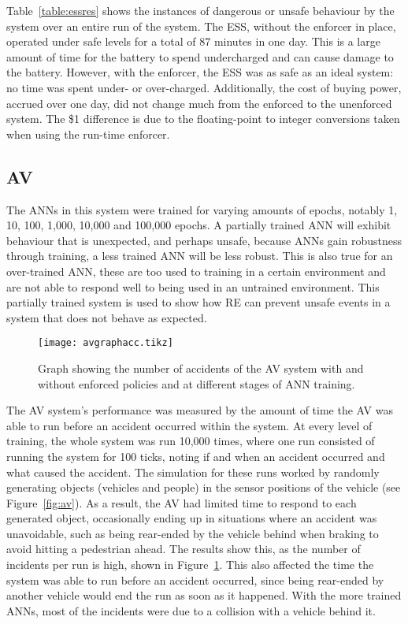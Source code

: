 Table~\ref{table:essres} shows the instances of dangerous or unsafe behaviour by the system over an entire run of the system.
The \ac{ESS}, without the enforcer in place, operated under safe levels for a total of 87 minutes in one day.
This is a large amount of time for the battery to spend undercharged and can cause damage to the battery.
However, with the enforcer, the \ac{ESS} was as safe as an ideal system: no time was spent under- or over-charged.
Additionally, the cost of buying power, accrued over one day, did not change much from the enforced to the unenforced system.
The \$1 difference is due to the floating-point to integer conversions taken when using the run-time enforcer.

\subsection{\acf{AV}}
The \acp{ANN} in this system were trained for varying amounts of epochs, notably 1, 10, 100, 1,000, 10,000 and 100,000 epochs.
A partially trained \ac{ANN} will exhibit behaviour that is unexpected, and perhaps unsafe, because \acp{ANN} gain robustness through training, a less trained \ac{ANN} will be less robust.
This is also true for an over-trained \ac{ANN}, these are too used to training in a certain environment and are not able to respond well to being used in an untrained environment.
This partially trained system is used to show how \ac{RE} can prevent unsafe events in a system that does not behave as expected.

\begin{figure}[h]
	\centering
	\texttt{[image: avgraphacc.tikz]}
	\caption{Graph showing the number of accidents of the AV system with and without enforced policies and at different stages of \ac{ANN} training. \label{fig:avaccidents}}
\end{figure}

The \ac{AV} system's performance was measured by the amount of time the \ac{AV} was able to run before an accident occurred within the system.
At every level of training, the whole system was run 10,000 times, where one run consisted of running the system for 100 ticks, noting if and when an accident occurred and what caused the accident. 
The simulation for these runs worked by randomly generating objects (vehicles and people) in the sensor positions of the vehicle (see Figure~\ref{fig:av}).
As a result, the \ac{AV} had limited time to respond to each generated object, occasionally ending up in situations where an accident was unavoidable, such as being rear-ended by the vehicle behind when braking to avoid hitting a pedestrian ahead.
The results show this, as the number of incidents per run is high, shown in Figure~\ref{fig:avaccidents}.
This also affected the time the system was able to run before an accident occurred, since being rear-ended by another vehicle would end the run as soon as it happened.
With the more trained \acp{ANN}, most of the incidents were due to a collision with a vehicle behind it.


